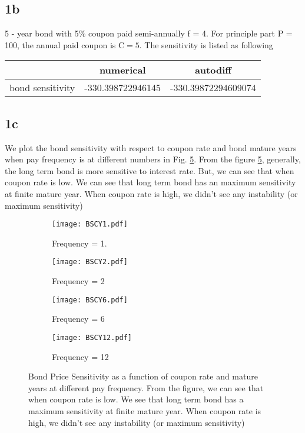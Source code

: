 \documentclass[a4paper,11pt]{article} %
\begin{document}
\subsection{1b}
5 - year bond with 5\% coupon paid semi-annually f = 4. For principle part P = 100, the annual paid coupon is $\mathrm{C = 5}$. The sensitivity is listed as following
\begin{center}
	\begin{tabular}{ |c|c|c| } 
		\hline
		& numerical& autodiff \\ 
		\hline
		bond sensitivity & -330.398722946145  & -330.39872294609074 \\ 
		\hline
	\end{tabular}
\end{center}
\subsection{1c}
We plot the bond sensitivity with respect to coupon rate and bond mature years when pay frequency is at different numbers in Fig. \ref{BSCY}. From the figure \ref{BSCY}, generally, the long term bond is more sensitive to interest rate. But, we can see that when coupon rate is low. We can see that long term bond has an maximum sensitivity at finite mature year. When coupon rate is high, we didn’t see any instability (or maximum sensitivity)
\begin{figure}[hbt]
	\centering
	\begin{subfigure}{0.45\textwidth}
		\texttt{[image: BSCY1.pdf]}
		\caption{Frequency = 1.}
		\label{fig:first}
	\end{subfigure}
	\hfill
	\begin{subfigure}{0.45\textwidth}
		\texttt{[image: BSCY2.pdf]}
		\caption{Frequency = 2}
		\label{fig:second}
	\end{subfigure}
	\hfill
	\begin{subfigure}{0.45\textwidth}
		\texttt{[image: BSCY6.pdf]}
		\caption{Frequency = 6}
		\label{fig:third}
	\end{subfigure}
	\hfill
	\begin{subfigure}{0.45\textwidth}
		\texttt{[image: BSCY12.pdf]}
		\caption{Frequency = 12}
		\label{ffig:four}
	\end{subfigure}
	\caption{Bond Price Sensitivity as a function of coupon rate and mature years at different pay frequency. From the figure, we can see that when coupon rate is low. We see that long term bond has a maximum sensitivity at finite mature year.  When coupon rate is high, we didn't see any instability (or maximum sensitivity)}
	\label{BSCY}
\end{figure}\\
\end{document}
